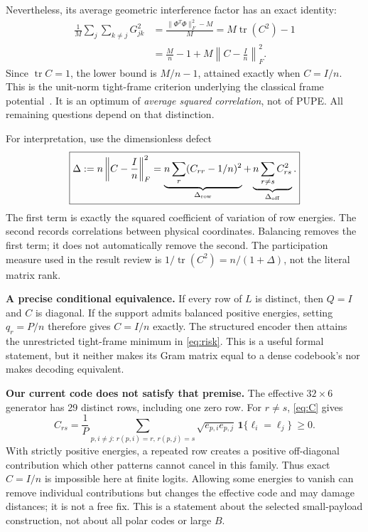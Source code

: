 \documentclass[10pt,a4paper]{article}
\newcommand{\tr}{\operatorname{tr}}
\begin{document}
Nevertheless, its average geometric interference factor has an exact identity:
\begin{align}
 \frac1M\sum_j\sum_{k\ne j}G_{jk}^2
 &=\frac{\|\Phi^T\Phi\|_F^2-M}{M}=M\tr(C^2)-1\\
 &=\frac Mn-1+M\left\|C-\frac{I}{n}\right\|_F^2.
 \label{eq:risk}
\end{align}
Since $\tr C=1$, the lower bound is $M/n-1$, attained exactly when $C=I/n$. This is the unit-norm tight-frame
criterion underlying the classical frame potential~\cite{frame}. It is an optimum of \emph{average squared
correlation}, not of PUPE. All remaining questions depend on that distinction.

For interpretation, use the dimensionless defect
\begin{equation}
 \boxed{\Delta:=n\left\|C-\frac{I}{n}\right\|_F^2
 =\underbrace{n\sum_r(C_{rr}-1/n)^2}_{\Delta_{\rm row}}
 +\underbrace{n\sum_{r\ne s}C_{rs}^2}_{\Delta_{\rm off}}.}
 \label{eq:split}
\end{equation}
The first term is exactly the squared coefficient of variation of row energies. The second records correlations
between physical coordinates. Balancing removes the first term; it does not automatically remove the second.
The participation measure used in the result review is $1/\tr(C^2)=n/(1+\Delta)$, not the literal matrix rank.

\textbf{A precise conditional equivalence.} If every row of $L$ is distinct, then $Q=I$ and $C$ is diagonal.
If the support admits balanced positive energies, setting $q_r=P/n$ therefore gives $C=I/n$ exactly.
The structured encoder then attains the unrestricted tight-frame minimum in \eqref{eq:risk}. This is a useful
formal statement, but it neither makes its Gram matrix equal to a dense codebook's nor makes decoding equivalent.

\textbf{Our current code does not satisfy that premise.} The effective $32\times6$ generator has 29 distinct
rows, including one zero row. For $r\ne s$, \eqref{eq:C} gives
\begin{equation}
 C_{rs}=\frac1P\sum_{p,i\ne j:\,r(p,i)=r,\,r(p,j)=s}
     \sqrt{e_{p,i}e_{p,j}}\,\mathbf1\{\ell_i=\ell_j\}\ \geq 0.
 \label{eq:duplicates}
\end{equation}
With strictly positive energies, a repeated row creates a positive off-diagonal contribution which other patterns
cannot cancel in this family. Thus exact $C=I/n$ is impossible here at finite logits. Allowing some energies to vanish
can remove individual contributions but changes the effective code and may damage distances; it is not a free fix.
This is a statement about the selected small-payload construction, not about all polar codes or large $B$.
\end{document}
